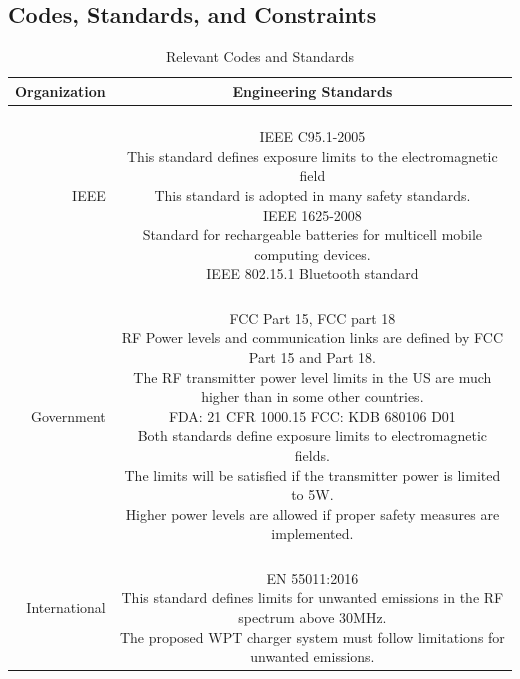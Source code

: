 \documentclass[12pt]{article}
\renewcommand{\thesection}{\Roman{section}}
\renewcommand{\thesubsection}{\thesection.\Alph{subsection}}
\begin{document}
\renewcommand{\thesubsection}{\thesection.\arabic{subsection}}




\pagebreak

\begin{appendices}

\section{Codes, Standards, and Constraints}
\begin{table}[h!]
\centering
\caption{Relevant Codes and Standards}
\begin{tabular} {| r | c | }
\hline
\parbox{0.17\linewidth}{\centering Organization} &   \parbox{0.772\linewidth}{\centering Engineering Standards}\\
\hline
\parbox{0.17\linewidth}{\raggedleft IEEE} &   \parbox{0.772\linewidth}{\hfill \\
IEEE C95.1-2005\\
This standard defines exposure limits to the electromagnetic field \\
This standard is adopted in many safety standards. \\
IEEE 1625-2008 \\
Standard for rechargeable batteries for multicell mobile computing devices.\\
IEEE 802.15.1 Bluetooth standard \\
}\\
\hline
\parbox{0.17\linewidth}{\raggedleft Government} &   \parbox{0.772\linewidth}{\hfill \\
FCC Part 15, FCC part 18\\
RF Power levels and communication links are defined by FCC Part 15 and Part 18.\\
The RF transmitter power level limits in the US are much higher than in some other countries.\\
FDA: 21 CFR 1000.15 FCC: KDB 680106 D01   \\
Both standards define exposure limits to electromagnetic fields.\\
The limits will be satisfied if the transmitter power is limited to 5W.\\
Higher power levels are allowed if proper safety measures are implemented.\\
}\\
\hline
\parbox{0.17\linewidth}{\raggedleft International} &   \parbox{0.772\linewidth}{\hfill \\
EN 55011:2016\\
This standard defines limits for unwanted emissions in the RF spectrum above 30MHz. \\
The proposed WPT charger system must follow limitations for unwanted emissions.\\
}\\
\hline
\end{tabular}
\end{table}
\hfill
\pagebreak


\end{appendices}
\end{document}
